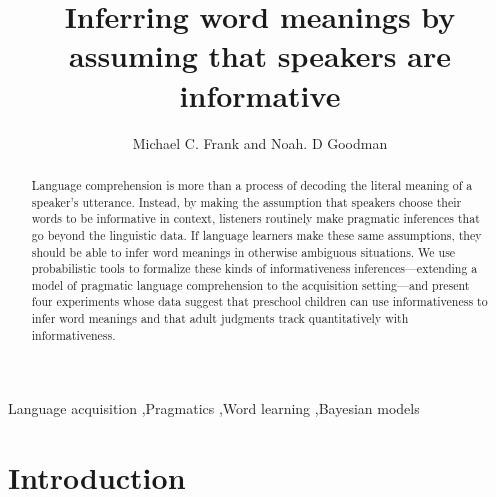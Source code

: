 \documentclass[review]{elsarticle}
\begin{document}
\begin{frontmatter}

\title{Inferring word meanings by assuming that speakers are informative}

\author{Michael C. Frank and Noah. D Goodman}
\address{Department of Psychology, Stanford University}

\begin{abstract}
Language comprehension is more than a process of decoding the literal meaning of a speaker's utterance. Instead, by making the assumption that speakers choose their words to be informative in context, listeners routinely make pragmatic inferences that go beyond the linguistic data. If language learners make these same assumptions, they should be able to infer word meanings in otherwise ambiguous situations. We use probabilistic tools to formalize these kinds of informativeness inferences---extending a model of pragmatic language comprehension to the acquisition setting---and present four experiments whose data suggest that preschool children can use informativeness to infer word meanings and that adult judgments track quantitatively with informativeness.
\end{abstract}


\begin{keyword}
Language acquisition \sep Pragmatics \sep Word learning \sep Bayesian models
\end{keyword}

\end{frontmatter} 

\section{Introduction}
\end{document}
